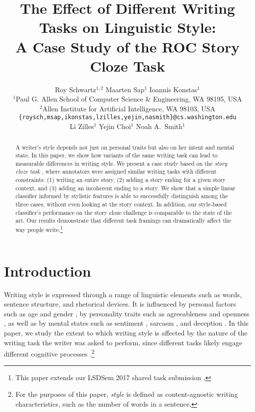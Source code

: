 \documentclass[11pt,a4paper]{article}
\title{The Effect of Different Writing Tasks on Linguistic Style:\\ A Case Study of the ROC Story Cloze Task}
\author{\hspace{2cm}Roy Schwartz$^{1,2}$ \And \hspace{2.5cm}Maarten Sap$^1$ \And \hspace{3cm}Ioannis Konstas$^1$ \And \\
  $^1$Paul G. Allen School of Computer Science \& Engineering, WA 98195, USA \\
  $^2$Allen Institute for Artificial Intelligence, WA 98103, USA \\
    {\tt \{roysch,msap,ikonstas,lzilles,yejin,nasmith\}@cs.washington.edu}  \\
    \And \hspace{-2cm}Li Zilles$^1$ \And \hspace{-2.5cm}Yejin Choi$^1$ \And \hspace{-2.5cm}Noah A.~Smith$^1$ \\
  }
\date{}
\begin{document}
\maketitle
\begin{abstract}
A writer's style depends not just on personal traits but also on her intent and mental state.
In this paper, we show how variants of the same writing task can lead to measurable differences in writing style.
We present a case study based on 
the  {\it story cloze task} \cite{Mostafazadeh:2016},
where annotators were assigned similar writing tasks with different constraints: (1) writing an entire story, (2) adding a story ending for a given story context, and (3) adding an incoherent ending to a story.
We show that a simple linear classifier informed by stylistic features is able to successfully distinguish among the three cases, without even looking at the story context.
In addition, our style-based classifier's performance on the
  story cloze challenge is comparable to the state of the art.
Our results demonstrate that different task framings can dramatically affect the way people write.\footnote{This paper extends our LSDSem 2017 shared task submission \cite{Schwartz:2017b}.}


\end{abstract}

\section{Introduction}
Writing style is expressed through a range of linguistic elements such as words, sentence structure, and rhetorical devices.
It is influenced by personal factors such as age and gender \cite{Schler:2006}, 
by personality traits such as agreeableness and openness  \cite{Ireland:2014b},
as well as by mental states such as sentiment \cite{Davidov:2010}, sarcasm \cite{Tsur:2010}, and deception \cite{Feng:2012}.  
In this paper, we study the extent to which writing style is affected by the nature of the writing task the writer was asked to perform, since
different tasks likely engage different cognitive processes \cite{Campbell:2003,Banerjee:2014}.\footnote{For the purposes of this paper, \emph{style} is defined as content-agnostic writing characteristics, such as the number of words in a sentence.}
\end{document}
